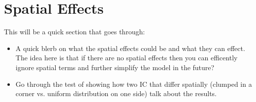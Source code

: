 \section{Spatial Effects}

This will be a quick section that goes through:

\begin{itemize}
  \item A quick blerb on what the spatial effects could be and what they can effect. The idea here is that if there are no spatial effects then you can efficently ignore spatial terms and further simplify the model in the future?
  \item Go through the test of showing how two IC that differ spatially (clumped in a corner vs. uniform distribution on one side) talk about the results.
\end{itemize}
